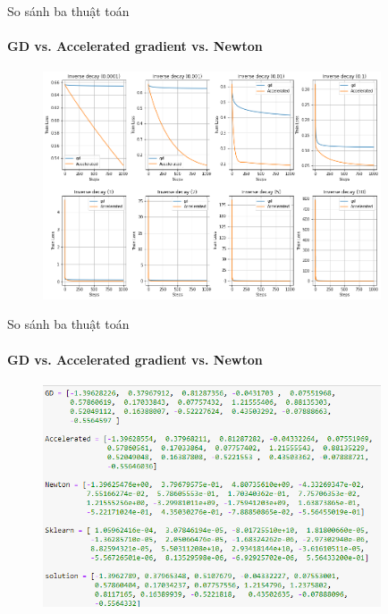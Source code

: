 \documentclass[10pt]{beamer}
\theoremstyle{remark}
\theoremstyle{definition}
\begin{document}
\begin{frame}{So sánh ba thuật toán}
	\framesubtitle{GD vs. Accelerated gradient vs. Newton}
	\begin{figure}[h!]
		\centering
		\includegraphics[width=10cm]{Thinh/27.png}
	\end{figure}
\end{frame}

\begin{frame}{So sánh ba thuật toán}
	\framesubtitle{GD vs. Accelerated gradient vs. Newton}
	\begin{figure}[h!]
		\centering
		\includegraphics[width=10cm]{Thinh/28.png}
	\end{figure}
\end{frame}
\end{document}
